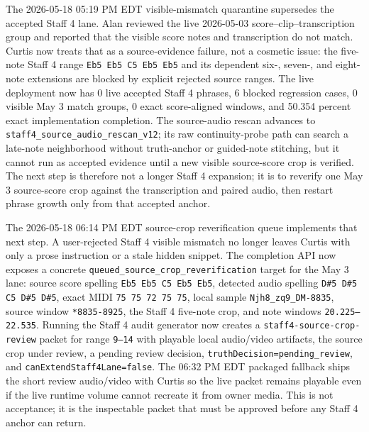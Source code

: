 The 2026-05-18 05:19 PM EDT visible-mismatch quarantine supersedes the accepted Staff 4 lane. Alan reviewed the live 2026-05-03 score--clip--transcription group and reported that the visible score notes and transcription do not match. Curtis now treats that as a source-evidence failure, not a cosmetic issue: the five-note Staff 4 range \texttt{Eb5 Eb5 C5 Eb5 Eb5} and its dependent six-, seven-, and eight-note extensions are blocked by explicit rejected source ranges. The live deployment now has 0 live accepted Staff 4 phrases, 6 blocked regression cases, 0 visible May 3 match groups, 0 exact score-aligned windows, and 50.354 percent exact implementation completion. The source-audio rescan advances to \texttt{staff4\_source\_audio\_rescan\_v12}; its raw continuity-probe path can search a late-note neighborhood without truth-anchor or guided-note stitching, but it cannot run as accepted evidence until a new visible source-score crop is verified. The next step is therefore not a longer Staff 4 expansion; it is to reverify one May 3 source-score crop against the transcription and paired audio, then restart phrase growth only from that accepted anchor.

The 2026-05-18 06:14 PM EDT source-crop reverification queue implements that next step. A user-rejected Staff 4 visible mismatch no longer leaves Curtis with only a prose instruction or a stale hidden snippet. The completion API now exposes a concrete \texttt{queued\_source\_crop\_reverification} target for the May 3 lane: source score spelling \texttt{Eb5 Eb5 C5 Eb5 Eb5}, detected audio spelling \texttt{D\#5 D\#5 C5 D\#5 D\#5}, exact MIDI \texttt{75 75 72 75 75}, local sample \texttt{Njh8\_zq9\_DM-8835}, source window \texttt{*8835-8925}, the Staff 4 five-note crop, and note windows \texttt{20.225--22.535}. Running the Staff 4 audit generator now creates a \texttt{staff4-source-crop-review} packet for range \texttt{9--14} with playable local audio/video artifacts, the source crop under review, a pending review decision, \texttt{truthDecision=pending\_review}, and \texttt{canExtendStaff4Lane=false}. The 06:32 PM EDT packaged fallback ships the short review audio/video with Curtis so the live packet remains playable even if the live runtime volume cannot recreate it from owner media. This is not acceptance; it is the inspectable packet that must be approved before any Staff 4 anchor can return.


